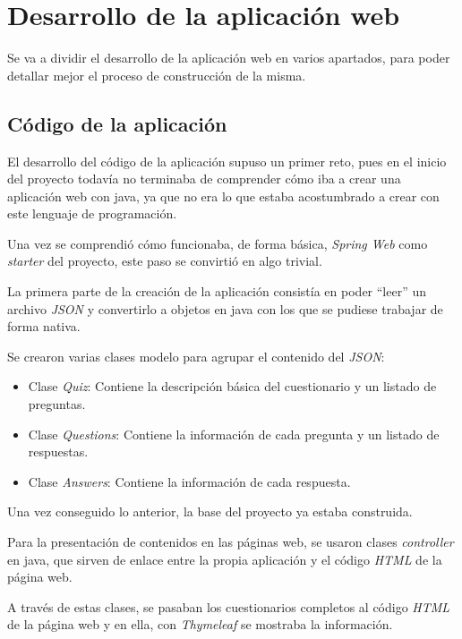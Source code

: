 \section{Desarrollo de la aplicación web}

Se va a dividir el desarrollo de la aplicación web en varios apartados, para poder detallar mejor el proceso de construcción de la misma.

\subsection{Código de la aplicación}

El desarrollo del código de la aplicación supuso un primer reto, pues en el inicio del proyecto todavía no terminaba de comprender cómo iba a crear una aplicación web con java, ya que no era lo que estaba acostumbrado a crear con este lenguaje de programación.

Una vez se comprendió cómo funcionaba, de forma básica, \textit{Spring Web} como \textit{starter} del proyecto, este paso se convirtió en algo trivial.

La primera parte de la creación de la aplicación consistía en poder ``leer'' un archivo \textit{JSON} y convertirlo a objetos en java con los que se pudiese trabajar de forma nativa.

Se crearon varias clases modelo para agrupar el contenido del \textit{JSON}:

 \begin{itemize}
	\item Clase \textit{Quiz}: Contiene la descripción básica del cuestionario y un listado de preguntas.
	\item Clase \textit{Questions}: Contiene la información de cada pregunta y un listado de respuestas.
	\item Clase \textit{Answers}: Contiene la información de cada respuesta.
\end{itemize}

Una vez conseguido lo anterior, la base del proyecto ya estaba construida.

Para la presentación de contenidos en las páginas web, se usaron clases \textit{controller} en java, que sirven de enlace entre la propia aplicación y el código \textit{HTML} de la página web.

A través de estas clases, se pasaban los cuestionarios completos al código \textit{HTML} de la página web y en ella, con \textit{Thymeleaf} se mostraba la información.

